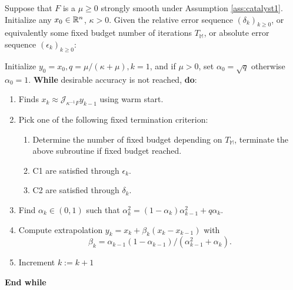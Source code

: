 \documentclass[12pt]{article}
\begin{document}
            \begin{definition}\label{def:catalyst-all-in-one}
                Suppose that $F$ is a $\mu \ge 0$ strongly smooth under Assumption \ref{ass:catalyst1}. 
                Initialize any $x_0 \in \mathbb {\mathbb R}^n$, $\kappa > 0$. 
                Given the relative error sequence $(\delta_k)_{k \ge 0}$, or equivalently some fixed budget number of iterations $T_{\mathbb M}$, or absolute error sequence $(\epsilon_k)_{k \ge 0}$: 
                \begin{tcolorbox}
                    Initialize $y_0 = x_0, q = \mu/(\kappa + \mu), k = 1$, and if $\mu > 0$, set $\alpha_0 = \sqrt{q}$ otherwise $\alpha_0 = 1$.  
                    \textbf{While} desirable accuracy is not reached, \textbf{do}: 
                    \begin{enumerate}
                        \item Finds $x_k \approx \mathcal J_{\kappa^{-1}F} y_{k - 1}$ using warm start. 
                        \item Pick one of the following fixed termination criterion: 
                        \begin{enumerate}
                            \item Determine the number of fixed budget depending on $T_{\mathbb M}$, terminate the above subroutine if fixed budget reached.
                            \item C1 are satisfied through $\epsilon_k$. 
                            \item C2 are satisfied through $\delta_k$. 
                        \end{enumerate}
                        \item Find $\alpha_k \in (0, 1)$ such that $\alpha_k^2 = (1 - \alpha_{k})\alpha_{k - 1}^2 + q\alpha_k$. 
                        \item Compute extrapolation $y_k = x_k + \beta_k(x_k - x_{k - 1})$ with 
                        $$
                            \beta_{k} = \alpha_{k - 1}(1 - \alpha_{k - 1})/(\alpha_{k - 1}^2 + \alpha_k). 
                        $$
                        \item Increment $k := k + 1$
                    \end{enumerate}
                    \textbf{End while} 
                \end{tcolorbox}
            \end{definition}
\end{document}
